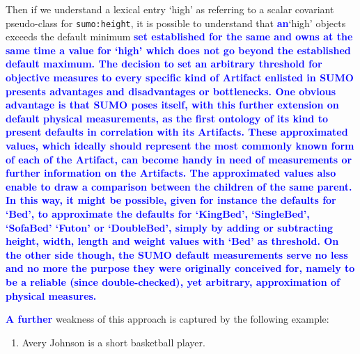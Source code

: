 \documentclass[11pt]{article}
\begin{document}
Then if we understand a lexical entry `high' as referring to a scalar covariant pseudo-class for {\tt sumo:height},
it is possible to understand that \textbf{\textcolor{blue}{an}}`high' objects exceeds the default minimum \textbf{\textcolor{blue}{set established for the same and owns at the same time a value for `high' which does not go beyond the established default maximum. The decision to set an arbitrary threshold for objective measures to every specific kind of Artifact enlisted in SUMO presents advantages and disadvantages or bottlenecks. One obvious advantage is that SUMO poses itself, with this further extension on default physical measurements, as the first ontology of its kind to present defaults in correlation with its Artifacts. These approximated values, which ideally should represent the most commonly known form of each of the Artifact, can become handy in need of measurements or further information on the Artifacts. The approximated values also enable to draw a comparison between the children of the same parent. In this way, it might be possible, given for instance the defaults for `Bed', to approximate the defaults for `KingBed', `SingleBed', `SofaBed' `Futon' or `DoubleBed', simply by adding or subtracting height, width, length and weight values with `Bed' as threshold. On the other side though, the SUMO default measurements serve no less and no more the purpose they were originally conceived for, namely to be a reliable (since double-checked), yet arbitrary, approximation of physical measures.}}

\textbf{\textcolor{blue}{A further}} weakness of this approach is captured by the following example:

\begin{enumerate}[resume]
    \item Avery Johnson is a short basketball player. \label{ex:avery}
\end{enumerate}
\end{document}
